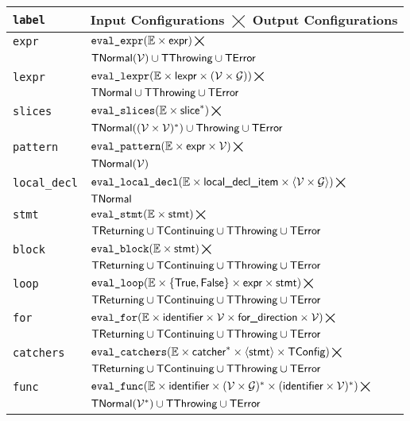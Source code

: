 \documentclass{book}
\newcommand\XGraphs[0]{\mathcal{G}}
\newcommand\vals[0]{\mathcal{V}}
\newcommand\evalexpr[1]{\texttt{eval\_expr}(#1)}
\newcommand\evallexpr[1]{\texttt{eval\_lexpr}(#1)}
\newcommand\evalpattern[1]{\texttt{eval\_pattern}(#1)}
\newcommand\evallocaldecl[1]{\texttt{eval\_local\_decl}(#1)}
\newcommand\evalslices[1]{\texttt{eval\_slices}(#1)}
\newcommand\evalstmt[1]{\texttt{eval\_stmt}(#1)}
\newcommand\evalblock[1]{\texttt{eval\_block}(#1)}
\newcommand\evalloop[1]{\texttt{eval\_loop}(#1)}
\newcommand\evalfor[1]{\texttt{eval\_for}(#1)}
\newcommand\evalcatchers[1]{\texttt{eval\_catchers}(#1)}
\newcommand\evalfunc[1]{\texttt{eval\_func}(#1)}
\newcommand\Throwing[0]{\textsf{Throwing}}
\begin{document}
\begin{tabular}{ll}
  \textbf{\texttt{label}} & \textbf{Input Configurations $\bigtimes$ Output Configurations} \\
  \hline
  \hline
  \texttt{expr}         & $\evalexpr{\envs \times \expr} \bigtimes$\\
                        & $\TNormal(\vals) \cup \TThrowing \cup \TError$\\
  \hline
  \texttt{lexpr}        & $\evallexpr{\envs \times \lexpr \times (\vals \times \XGraphs)} \bigtimes$\\
                        & $\textsf{TNormal} \cup \textsf{TThrowing} \cup \textsf{TError}$\\
  \hline
  \texttt{slices}       & $\evalslices{\envs \times \slice^*} \bigtimes$\\
                        & $\TNormal((\vals \times \vals)^*) \cup \Throwing \cup \TError$ \\
  \hline
  \texttt{pattern}      & $\evalpattern{\envs \times \expr \times \vals} \bigtimes$\\
                        & $\TNormal(\vals)$ \\
  \hline
  \texttt{local\_decl}  & $\evallocaldecl{\envs \times \localdeclitem \times \langle\vals\times\XGraphs\rangle} \bigtimes$\\
  & $\textsf{TNormal}$ \\
  \hline
  \texttt{stmt}         & $\evalstmt{\envs \times \stmt} \bigtimes$\\
                        & $\textsf{TReturning} \cup \textsf{TContinuing} \cup \textsf{TThrowing} \cup \textsf{TError}$ \\
  \hline
  \texttt{block}        & $\evalblock{\envs \times \stmt} \bigtimes$\\
                        & $\textsf{TReturning} \cup \textsf{TContinuing} \cup \textsf{TThrowing} \cup \textsf{TError}$ \\
  \hline
  \texttt{loop}         & $\evalloop{\envs \times \{\True,\False\} \times \expr \times \stmt} \bigtimes$\\
                        & $\textsf{TReturning} \cup \textsf{TContinuing} \cup \textsf{TThrowing} \cup \textsf{TError}$ \\
  \hline
  \texttt{for}          & $\evalfor{\envs \times \identifier \times \vals \times \fordirection \times \vals} \bigtimes$\\
                        & $\textsf{TReturning} \cup \textsf{TContinuing} \cup \textsf{TThrowing} \cup \textsf{TError}$ \\
  \hline
  \texttt{catchers}     & $\evalcatchers{\envs \times \catcher^* \times \langle\stmt\rangle \times \TConfig} \bigtimes$\\
                        & $\textsf{TReturning} \cup \textsf{TContinuing} \cup \textsf{TThrowing} \cup \textsf{TError}$ \\
  \hline
  \texttt{func}         & $\evalfunc{\envs \times \identifier \times (\vals \times \XGraphs)^* \times (\identifier\times\vals)^*} \bigtimes$ \\
                        & $\TNormal(\vals^*) \cup \TThrowing \cup \TError$ \\
  \end{tabular}
\end{document}
